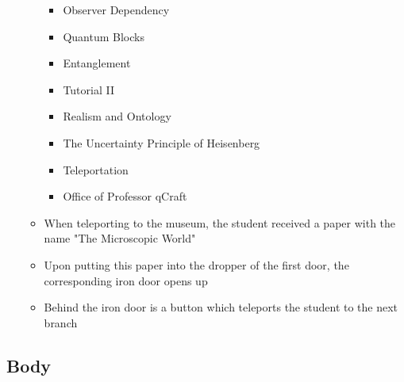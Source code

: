 \documentclass[11pt,twoside]{report} %
\begin{document}
\begin{itemize}
\begin{itemize}
\begin{itemize}
			\item Observer Dependency
			\item Quantum Blocks
			\item Entanglement
			\item Tutorial II
			\item Realism and Ontology
			\item The Uncertainty Principle of Heisenberg
			\item Teleportation
			\item Office of Professor qCraft
		\end{itemize}
		\item When teleporting to the museum, the student received a paper with the name "The Microscopic World"
		\item Upon putting this paper into the dropper of the first door, the corresponding iron door opens up
		\item Behind the iron door is a button which teleports the student to the next branch
	\end{itemize}
\end{itemize}

\subsection{Body}
\end{document}
